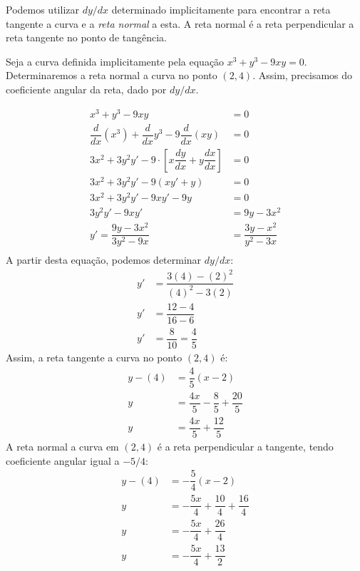 Podemos utilizar $dy/dx$ determinado implicitamente para encontrar a reta tangente a curva e a \emph{reta normal} a esta. A reta normal é a reta perpendicular a reta tangente no ponto de tangência.
\begin{exemplo}
Seja a curva definida implicitamente pela equação $x^3+y^3-9xy=0$. Determinaremos a reta normal a curva no ponto $(2,4)$.
Assim, precisamos do coeficiente angular da reta, dado por $dy/dx$.
\begin{center}
\end{center}%
\begin{align*}
x^3+y^3-9xy&=0 \\
\dfrac{d}{dx}(x^3)+\dfrac{d}{dx}y^3 -9 \dfrac{d}{dx}(xy)&=0 \\
3x^2+3y^2y'-9\cdot \left[x\dfrac{dy}{dx}+y\dfrac{dx}{dx}\right]&=0 \\
3x^2+3y^2y'-9\left(xy'+y\right)&=0\\
3x^2+3y^2y'-9xy'-9y&=0\\
3y^2y'-9xy'&=9y-3x^2 \\
y'=\dfrac{9y-3x^2}{3y^2-9x}&=\dfrac{3y-x^2}{y^2-3x} \\
\end{align*}
A partir desta equação, podemos determinar $dy/dx$:
\begin{align*}
y'&=\dfrac{3(4)-(2)^2}{(4)^2-3(2)} \\
y'&=\dfrac{12-4}{16-6}\\
y'&=\dfrac{8}{10}=\dfrac{4}{5}
\end{align*}
Assim, a reta tangente a curva no ponto $(2,4)$ é:
\begin{align*}
y-(4)&=\dfrac{4}{5}(x-2) \\
y&=\dfrac{4x}{5}-\dfrac{8}{5}+\dfrac{20}{5}\\
y&=\dfrac{4x}{5}+\dfrac{12}{5}
\end{align*}
A reta normal a curva em $(2,4)$ é a reta perpendicular a tangente, tendo coeficiente angular igual a $-5/4$:
\begin{align*}
y-(4)&=-\dfrac{5}{4}(x-2) \\
y&=-\dfrac{5x}{4}+\dfrac{10}{4}+\dfrac{16}{4}\\
y&=-\dfrac{5x}{4}+\dfrac{26}{4}\\
y&=-\dfrac{5x}{4}+\dfrac{13}{2}
\end{align*}
\end{exemplo}

